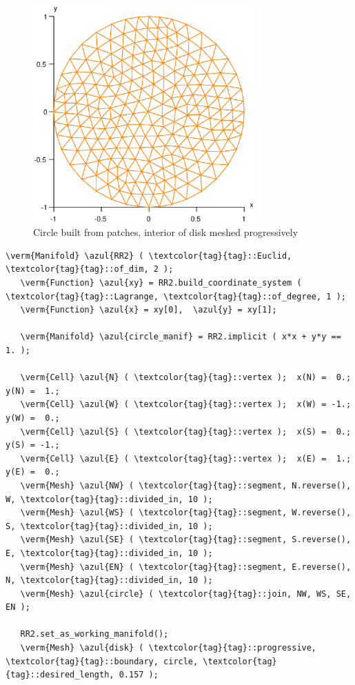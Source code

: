 \begin{figure} \centering
 \includegraphics[width=85mm]{disk-with-tri}
 \caption{Circle built from patches, interior of disk meshed progressively}
 \label{\numb section 3.\numb fig 1}
\end{figure}

\begin{Verbatim}[commandchars=\\\{\},formatcom=\small\tt,frame=single,
   label=parag-\ref{\numb section 3.\numb parag 1}.cpp,rulecolor=\color{coment},
   baselinestretch=0.94,framesep=2mm                                            ]
   \verm{Manifold} \azul{RR2} ( \textcolor{tag}{tag}::Euclid, \textcolor{tag}{tag}::of_dim, 2 );
   \verm{Function} \azul{xy} = RR2.build_coordinate_system ( \textcolor{tag}{tag}::Lagrange, \textcolor{tag}{tag}::of_degree, 1 );
   \verm{Function} \azul{x} = xy[0],  \azul{y} = xy[1];
   
   \verm{Manifold} \azul{circle_manif} = RR2.implicit ( x*x + y*y == 1. );
   
   \verm{Cell} \azul{N} ( \textcolor{tag}{tag}::vertex );  x(N) =  0.;   y(N) =  1.;
   \verm{Cell} \azul{W} ( \textcolor{tag}{tag}::vertex );  x(W) = -1.;   y(W) =  0.;
   \verm{Cell} \azul{S} ( \textcolor{tag}{tag}::vertex );  x(S) =  0.;   y(S) = -1.;
   \verm{Cell} \azul{E} ( \textcolor{tag}{tag}::vertex );  x(E) =  1.;   y(E) =  0.;
   \verm{Mesh} \azul{NW} ( \textcolor{tag}{tag}::segment, N.reverse(), W, \textcolor{tag}{tag}::divided_in, 10 );
   \verm{Mesh} \azul{WS} ( \textcolor{tag}{tag}::segment, W.reverse(), S, \textcolor{tag}{tag}::divided_in, 10 );
   \verm{Mesh} \azul{SE} ( \textcolor{tag}{tag}::segment, S.reverse(), E, \textcolor{tag}{tag}::divided_in, 10 );
   \verm{Mesh} \azul{EN} ( \textcolor{tag}{tag}::segment, E.reverse(), N, \textcolor{tag}{tag}::divided_in, 10 );
   \verm{Mesh} \azul{circle} ( \textcolor{tag}{tag}::join, NW, WS, SE, EN );
   
   RR2.set_as_working_manifold();
   \verm{Mesh} \azul{disk} ( \textcolor{tag}{tag}::progressive, \textcolor{tag}{tag}::boundary, circle, \textcolor{tag}{tag}::desired_length, 0.157 );
\end{Verbatim}

